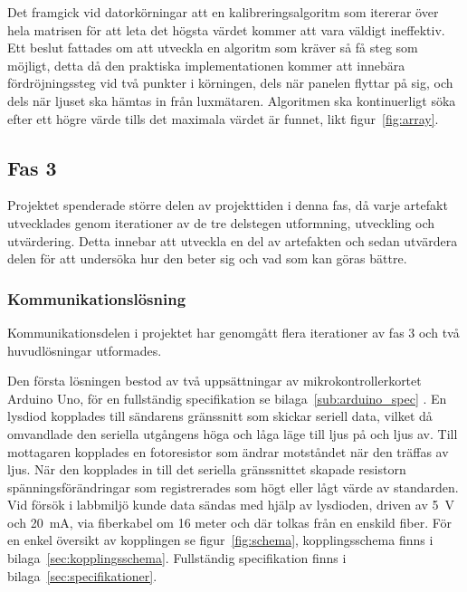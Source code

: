         Det framgick vid datorkörningar att en kalibreringsalgoritm som itererar över hela matrisen för att leta det högsta värdet kommer att vara väldigt ineffektiv. Ett beslut fattades om att utveckla en algoritm som kräver så få steg som möjligt, detta då den praktiska implementationen kommer att innebära fördröjningssteg vid två punkter i körningen, dels när panelen flyttar på sig, och dels när ljuset ska hämtas in från luxmätaren. Algoritmen ska kontinuerligt söka efter ett högre värde tills det maximala värdet är funnet, likt figur~\ref{fig:array}.


    \subsection{Fas 3} %
    \label{sub:steg_3}
        Projektet spenderade större delen av projekttiden i denna fas, då varje artefakt utvecklades genom iterationer av de tre delstegen utformning, utveckling och utvärdering. Detta innebar att utveckla en del av artefakten och sedan utvärdera delen för att undersöka hur den beter sig och vad som kan göras bättre.

        \newpage

        \subsubsection{Kommunikationslösning} %
        \label{ssub:utformning_av_kommunikationslosning}
            Kommunikationsdelen i projektet har genomgått flera iterationer av fas 3 och två huvudlösningar utformades.\bigskip 

            Den första lösningen bestod av två uppsättningar av mikrokontrollerkortet Arduino Uno, för en fullständig specifikation se bilaga~\ref{sub:arduino_spec} \cite{ardu}. En lysdiod kopplades till sändarens gränssnitt som skickar seriell data, vilket då omvandlade den seriella utgångens höga och låga läge till ljus på och ljus av. Till mottagaren kopplades en fotoresistor som ändrar motståndet när den träffas av ljus. När den kopplades in till det seriella gränssnittet skapade resistorn spänningsförändringar som registrerades som högt eller lågt värde av standarden. Vid försök i labbmiljö kunde data sändas med hjälp av lysdioden, driven av 5~V och 20~mA, via fiberkabel om 16 meter och där tolkas från en enskild fiber. För en enkel översikt av kopplingen se figur~\ref{fig:schema}, kopplingsschema finns i bilaga~\ref{sec:kopplingsschema}. Fullständig specifikation finns i bilaga~\ref{sec:specifikationer}.\bigskip

